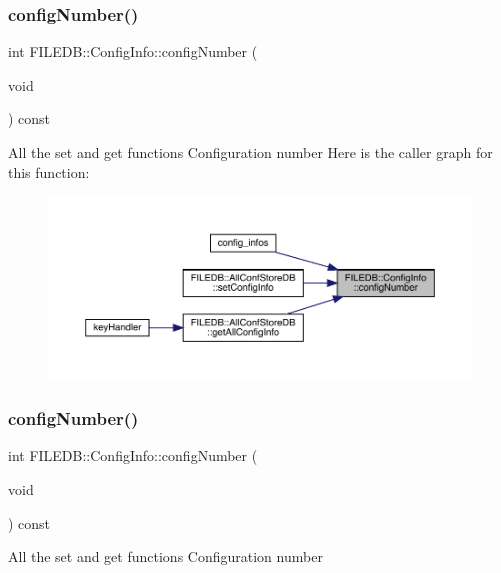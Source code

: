 \subsubsection{\texorpdfstring{configNumber()}{configNumber()}\hspace{0.1cm}{\footnotesize\ttfamily [1/6]}}
{\footnotesize\ttfamily int F\+I\+L\+E\+D\+B\+::\+Config\+Info\+::config\+Number (\begin{DoxyParamCaption}\item[{void}]{ }\end{DoxyParamCaption}) const}

All the set and get functions Configuration number Here is the caller graph for this function\+:
\nopagebreak
\begin{figure}[H]
\begin{center}
\leavevmode
\includegraphics[width=350pt]{d0/d90/classFILEDB_1_1ConfigInfo_ae4526dad4c6de972b1eb25ee8cd11c67_icgraph}
\end{center}
\end{figure}
\mbox{\label{classFILEDB_1_1ConfigInfo_ae4526dad4c6de972b1eb25ee8cd11c67}} 
\subsubsection{\texorpdfstring{configNumber()}{configNumber()}\hspace{0.1cm}{\footnotesize\ttfamily [2/6]}}
{\footnotesize\ttfamily int F\+I\+L\+E\+D\+B\+::\+Config\+Info\+::config\+Number (\begin{DoxyParamCaption}\item[{void}]{ }\end{DoxyParamCaption}) const}

All the set and get functions Configuration number \mbox{\label{classFILEDB_1_1ConfigInfo_ae4526dad4c6de972b1eb25ee8cd11c67}} 
